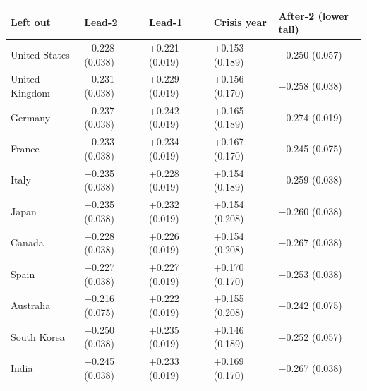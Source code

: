 \documentclass[11pt,a4paper]{article}
\newcounter{none}                    %
\begin{document}
{\def\LTcaptype{none} %
\begin{longtable}[]{@{}
  >{\raggedright\arraybackslash}p{}
  >{\raggedright\arraybackslash}p{}
  >{\raggedright\arraybackslash}p{}
  >{\raggedright\arraybackslash}p{}
  >{\raggedright\arraybackslash}p{}@{}}
\toprule\noalign{}
\begin{minipage}[b]{\linewidth}\raggedright
Left out
\end{minipage} & \begin{minipage}[b]{\linewidth}\raggedright
Lead-2
\end{minipage} & \begin{minipage}[b]{\linewidth}\raggedright
Lead-1
\end{minipage} & \begin{minipage}[b]{\linewidth}\raggedright
Crisis year
\end{minipage} & \begin{minipage}[b]{\linewidth}\raggedright
After-2 (lower tail)
\end{minipage} \\
\midrule\noalign{}
\endhead
\bottomrule\noalign{}
\endlastfoot
United States & +0.228 (0.038) & +0.221 (0.019) & +0.153 (0.189) & −0.250 (0.057) \\
United Kingdom & +0.231 (0.038) & +0.229 (0.019) & +0.156 (0.170) & −0.258 (0.038) \\
Germany & +0.237 (0.038) & +0.242 (0.019) & +0.165 (0.189) & −0.274 (0.019) \\
France & +0.233 (0.038) & +0.234 (0.019) & +0.167 (0.170) & −0.245 (0.075) \\
Italy & +0.235 (0.038) & +0.228 (0.019) & +0.154 (0.189) & −0.259 (0.038) \\
Japan & +0.235 (0.038) & +0.232 (0.019) & +0.154 (0.208) & −0.260 (0.038) \\
Canada & +0.228 (0.038) & +0.226 (0.019) & +0.154 (0.208) & −0.267 (0.038) \\
Spain & +0.227 (0.038) & +0.227 (0.019) & +0.170 (0.170) & −0.253 (0.038) \\
Australia & +0.216 (0.075) & +0.222 (0.019) & +0.155 (0.208) & −0.242 (0.075) \\
South Korea & +0.250 (0.038) & +0.235 (0.019) & +0.146 (0.189) & −0.252 (0.057) \\
India & +0.245 (0.038) & +0.233 (0.019) & +0.169 (0.170) & −0.267 (0.038) \\

\end{longtable}}
\end{document}

